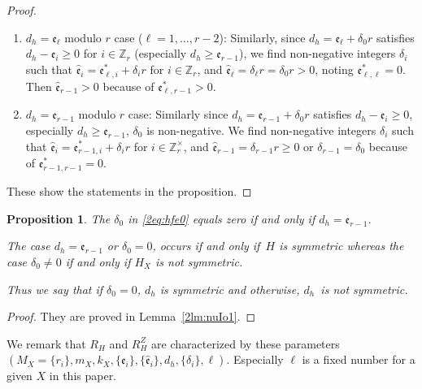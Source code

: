 \documentclass[10pt,a4paper]{amsart}
\def\ZZ{{\mathbb Z}}
\def\fe{{\mathfrak e}}
\def\hfe{{\widehat{\mathfrak e}}}
\numberwithin{equation}{section}
\newtheorem{Proposition}[Theorem]{Proposition}
 { \theoremstyle{definition}
\newtheorem{Definition}[Theorem]{Definition}
\newtheorem{Note}[Theorem]{Note}
\newtheorem{Example}[Theorem]{Example}
\newtheorem{Remark}[Theorem]{Remark} }
\begin{document}
\begin{proof}
\begin{enumerate}
\item $d_h = \fe_\ell$ modulo $r$ case ($\ell = 1, \dots, r-2$):
Similarly, since $d_h = \fe_\ell + \delta_0 r$ satisfies $d_h - \fe_i\ge0$ for $i \in \ZZ_r$ (especially $d_h \ge \fe_{r-1}$), we find non-negative integers $\delta_i$ such that $\hfe_i =\fe_{\ell,i}^* + \delta_i r$ for $i \in \ZZ_r$, and $\hfe_\ell = \delta_\ell r=\delta_0 r>0$, noting $\fe_{\ell,\ell}^*=0$.
Then $\hfe_{r-1}>0$ because of $\fe_{\ell,r-1}^*>0$.

\item $d_h = \fe_{r-1}$ modulo $r$ case:
Similarly since $d_h = \fe_{r-1} + \delta_0 r$ satisfies $d_h - \fe_i\ge0$, especially $d_h \ge \fe_{r-1}$, $\delta_0$ is non-negative.
We find non-negative integers $\delta_i$ such that $\hfe_i =\fe_{r-1,i}^* + \delta_i r$ for $i \in \ZZ_r^\times$, and $\hfe_{r-1} = \delta_{r-1} r\ge 0$ or $\delta_{r-1}=\delta_0$ because of $\fe_{r-1,r-1}^*=0$.
\end{enumerate}
These show the statements in the proposition.
\end{proof}

\begin{Proposition}\label{2pr:dh_symmetric}
The $\delta_0$ in \eqref{2eq:hfe0} equals zero if and only if $d_h = \fe_{r-1}$.

The case $d_h = \fe_{r-1}$ or $\delta_0=0$, occurs if and only if~$H$ is symmetric whereas
the case $\delta_0\neq 0$ if and only if $H_X$ is not symmetric.

Thus we say that if $\delta_0=0$, $d_h$ is symmetric and otherwise, $d_h$~is not symmetric.
\end{Proposition}

\begin{proof}They are proved in Lemma~\ref{2lm:nuIo1}.
\end{proof}

\begin{Remark}\label{2rm:R_Hparameters}
We remark that $R_H$ and $R_H^Z$ are characterized by these parameters $(M_X=\{r_i\},\allowbreak m_X, k_X, \{\fe_i\},\{\hfe_i\},d_h, \{\delta_i\}, \ell)$.
Especially $\ell$ is a fixed number for a given $X$ in this paper.
\end{Remark}
\end{document}
